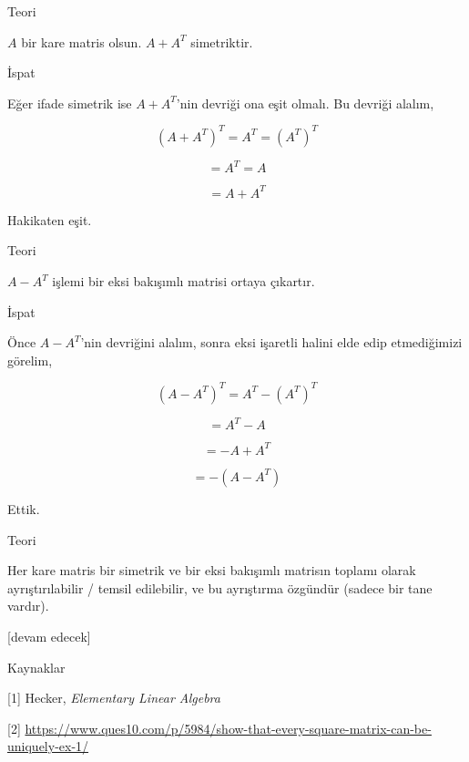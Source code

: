 \documentclass[12pt,fleqn]{article}\usepackage{../../common}
\begin{document}
Teori

$A$ bir kare matris olsun. $A + A^T$ simetriktir.

İspat

Eğer ifade simetrik ise $A + A^T$'nin devriği ona eşit olmalı. Bu devriği alalım,

$$
(A + A^T)^T = A^T = (A^T)^T
$$

$$
= A^T = A
$$

$$
= A + A^T
$$

Hakikaten eşit. 

Teori

$A - A^T$ işlemi bir eksi bakışımlı matrisi ortaya çıkartır.

İspat

Önce $A - A^T$'nin devriğini alalım, sonra eksi işaretli halini elde
edip etmediğimizi görelim,

$$
(A-A^T)^T = A^T - (A^T)^T
$$

$$
= A^T - A
$$

$$
= -A + A^T
$$

$$
= - (A-A^T)
$$

Ettik.

Teori

Her kare matris bir simetrik ve bir eksi bakışımlı matrisın toplamı olarak
ayrıştırılabilir / temsil edilebilir, ve bu ayrıştırma özgündür (sadece bir
tane vardır).


[devam edecek]

Kaynaklar

[1] Hecker, {\em Elementary Linear Algebra}

[2] \url{https://www.ques10.com/p/5984/show-that-every-square-matrix-can-be-uniquely-ex-1/}
\end{document}
